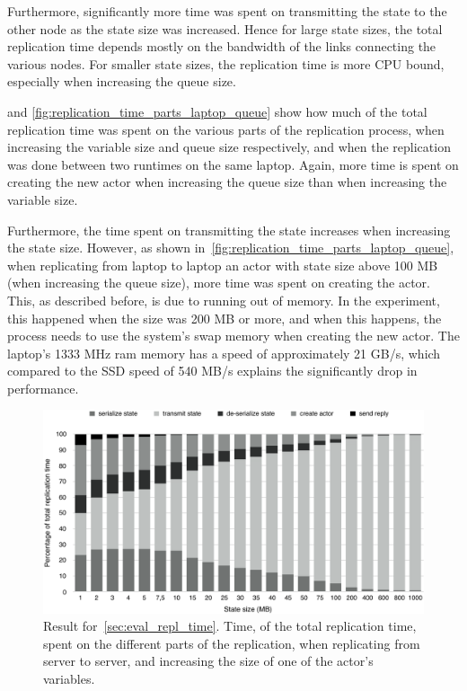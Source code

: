 \documentclass{cslthse-msc}
\begin{document}
Furthermore, significantly more time was spent on transmitting the state to the other node as the state size was increased. Hence for large state sizes, the total replication time depends mostly on the bandwidth of the links connecting the various nodes. For smaller state sizes, the replication time is more CPU bound, especially when increasing the queue size.

 and \cref{fig:replication_time_parts_laptop_queue} show how much of the total replication time was spent on the various parts of the replication process, when increasing the variable size and queue size respectively, and when the replication was done between two runtimes on the same laptop. Again, more time is spent on creating the new actor when increasing the queue size than when increasing the variable size. %

Furthermore, the time spent on transmitting the state increases when increasing the state size. However, as shown in~\cref{fig:replication_time_parts_laptop_queue}, when replicating from laptop to laptop an actor with state size above 100 MB (when increasing the queue size), more time was spent on creating the actor. This, as described before, is due to running out of memory. In the experiment, this happened when the size was 200 MB or more, and when this happens, the process needs to use the system's swap memory when creating the new actor. The laptop's 1333 MHz ram memory has a speed of approximately 21 GB/s, which compared to the SSD speed of 540 MB/s explains the significantly drop in performance.

\begin{figure}[hbt!]
\centering
\includegraphics[scale=0.5]{images/results/replication_time/server_parts_variable.pdf} 
\caption[Replication time parts in~\cref{sec:eval_repl_time}, server-server, increasing variable size]{Result for~\cref{sec:eval_repl_time}. Time, of the total replication time, spent on the different parts of the replication, when replicating from server to server, and increasing the size of one of the actor's variables.} \label{fig:replication_time_parts_server_variable}
\end{figure}
\end{document}
